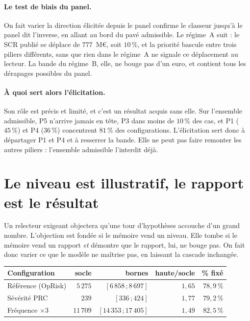 \paragraph{Le test de biais du panel.} On fait varier la direction élicitée depuis
\og{}le panel confirme le classeur\fg{} jusqu'à \og{}le panel dit l'inverse\fg{}, en
allant au bord du pavé admissible. Le régime~A suit : le SCR publié se déplace de
$777$~M\euro{}, soit $10\,\%$, et la priorité bascule entre trois piliers différents,
sans que rien dans le régime~A ne signale ce déplacement au lecteur. La bande du
régime~B, elle, ne bouge pas d'un euro, et contient tous les dérapages possibles du panel.

\paragraph{À quoi sert alors l'élicitation.} Son rôle est précis et limité, et c'est un
résultat acquis sans elle. Sur l'ensemble admissible, P5 n'arrive jamais en
tête, P3 dans moins de $10\,\%$ des cas, et P1 ($45\,\%$) et P4 ($36\,\%$) concentrent
$81\,\%$ des configurations. L'élicitation sert donc à départager P1 et P4 et à
resserrer la bande. Elle ne peut pas faire remonter les autres piliers : l'ensemble
admissible l'interdit déjà.


\section{Le niveau est illustratif, le rapport est le résultat}

Un relecteur exigeant objectera qu'une tour d'hypothèses accouche d'un grand nombre.
L'objection est fondée si le mémoire vend un niveau. Elle tombe si le mémoire vend un
rapport \emph{et} démontre que le rapport, lui, ne bouge pas. On fait donc varier ce que
le modèle ne maîtrise pas, en laissant la cascade inchangée.

\begin{center}\footnotesize
\renewcommand{\arraystretch}{1.25}
\begin{tabular}{@{}p{4.3cm} r r r r@{}}
\toprule
\textbf{Configuration} & \textbf{socle} & \textbf{bornes} &
\textbf{haute/socle} & \textbf{\% fixé} \\
\midrule
Référence (OpRisk)   & $5\,275$  & $[6\,858\,;8\,697]$   & $1{,}65$ & $78{,}9\,\%$ \\
Sévérité PRC         & $239$     & $[336\,;424]$         & $1{,}77$ & $79{,}2\,\%$ \\
Fréquence $\times 3$ & $11\,709$ & $[14\,353\,;17\,405]$ & $1{,}49$ & $82{,}5\,\%$ \\
\bottomrule
\end{tabular}
\end{center}

